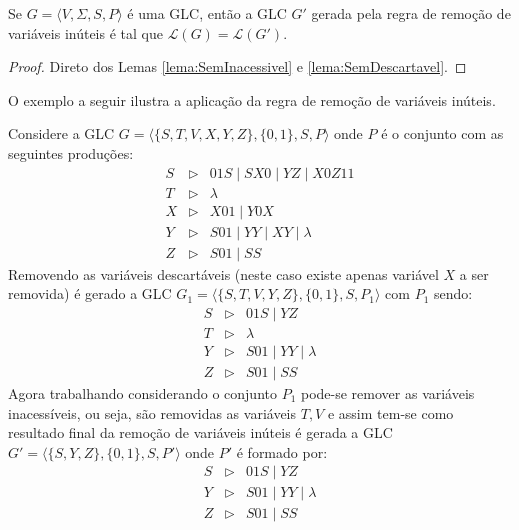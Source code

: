 \begin{theorem}\label{teo:SemVariaveisInuteis}
    Se $G = \langle V, \Sigma, S, P\rangle$ é uma GLC, então a GLC $G'$ gerada pela regra de remoção de variáveis inúteis é tal que $\mathcal{L}(G) = \mathcal{L}(G')$.
\end{theorem}

\begin{proof}
    Direto dos Lemas \ref{lema:SemInacessivel} e \ref{lema:SemDescartavel}.
\end{proof}

O exemplo a seguir ilustra a aplicação da regra de remoção de variáveis inúteis.

\begin{example}
    Considere a GLC $G = \langle \{S, T, V, X, Y, Z\}, \{0, 1\}, S, P \rangle$ onde $P$ é o conjunto com as seguintes produções:
    \begin{eqnarray*}
        S & \rhd & 01S \mid SX0 \mid YZ \mid X0Z11\\
        T & \rhd & \lambda\\
        X & \rhd & X01 \mid Y0X\\
        Y & \rhd & S01 \mid YY \mid XY \mid \lambda\\
        Z & \rhd & S01 \mid SS
    \end{eqnarray*}
    Removendo as variáveis descartáveis (neste caso existe apenas variável $X$ a ser removida)  é gerado a GLC $G_1 = \langle \{S, T, V, Y, Z\}, \{0, 1\}, S, P_1 \rangle$ com $P_1$ sendo:
    \begin{eqnarray*}
        S & \rhd & 01S \mid YZ \\
        T & \rhd & \lambda\\
        Y & \rhd & S01 \mid YY \mid \lambda\\
        Z & \rhd & S01 \mid SS
    \end{eqnarray*}
    Agora trabalhando considerando o conjunto $P_1$ pode-se remover as variáveis inacessíveis, ou seja, são removidas as variáveis $T, V$ e assim tem-se como resultado final da remoção de variáveis inúteis é gerada a GLC $G' = \langle \{S, Y, Z\}, \{0, 1\}, S, P' \rangle$ onde $P'$ é formado por:
    \begin{eqnarray*}
        S & \rhd & 01S \mid YZ \\
        Y & \rhd & S01 \mid YY \mid \lambda\\
        Z & \rhd & S01 \mid SS
    \end{eqnarray*}
\end{example}

